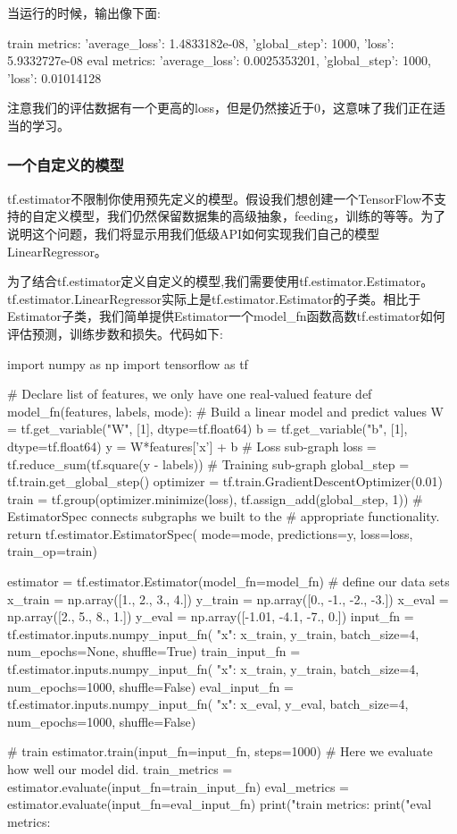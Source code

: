 当运行的时候，输出像下面:
\begin{pythoncode}
train metrics: {'average_loss': 1.4833182e-08, 'global_step': 1000, 'loss': 5.9332727e-08}
eval metrics: {'average_loss': 0.0025353201, 'global_step': 1000, 'loss': 0.01014128}
\end{pythoncode}
注意我们的评估数据有一个更高的loss，但是仍然接近于0，这意味了我们正在适当的学习。
\subsubsection{一个自定义的模型}
tf.estimator不限制你使用预先定义的模型。假设我们想创建一个TensorFlow不支持的自定义模型，我们仍然保留数据集的高级抽象，feeding，训练的等等。为了说明这个问题，我们将显示用我们低级API如何实现我们自己的模型LinearRegressor。

为了结合tf.estimator定义自定义的模型,我们需要使用tf.estimator.Estimator。tf.estimator.LinearRegressor实际上是tf.estimator.Estimator的子类。相比于Estimator子类，我们简单提供Estimator一个model\_fn函数高数tf.estimator如何评估预测，训练步数和损失。代码如下:
\begin{pythoncode}
import numpy as np
import tensorflow as tf

# Declare list of features, we only have one real-valued feature
def model_fn(features, labels, mode):
  # Build a linear model and predict values
  W = tf.get_variable("W", [1], dtype=tf.float64)
  b = tf.get_variable("b", [1], dtype=tf.float64)
  y = W*features['x'] + b
  # Loss sub-graph
  loss = tf.reduce_sum(tf.square(y - labels))
  # Training sub-graph
  global_step = tf.train.get_global_step()
  optimizer = tf.train.GradientDescentOptimizer(0.01)
  train = tf.group(optimizer.minimize(loss),
                   tf.assign_add(global_step, 1))
  # EstimatorSpec connects subgraphs we built to the
  # appropriate functionality.
  return tf.estimator.EstimatorSpec(
      mode=mode,
      predictions=y,
      loss=loss,
      train_op=train)

estimator = tf.estimator.Estimator(model_fn=model_fn)
# define our data sets
x_train = np.array([1., 2., 3., 4.])
y_train = np.array([0., -1., -2., -3.])
x_eval = np.array([2., 5., 8., 1.])
y_eval = np.array([-1.01, -4.1, -7., 0.])
input_fn = tf.estimator.inputs.numpy_input_fn(
    {"x": x_train}, y_train, batch_size=4, num_epochs=None, shuffle=True)
train_input_fn = tf.estimator.inputs.numpy_input_fn(
    {"x": x_train}, y_train, batch_size=4, num_epochs=1000, shuffle=False)
eval_input_fn = tf.estimator.inputs.numpy_input_fn(
    {"x": x_eval}, y_eval, batch_size=4, num_epochs=1000, shuffle=False)

# train
estimator.train(input_fn=input_fn, steps=1000)
# Here we evaluate how well our model did.
train_metrics = estimator.evaluate(input_fn=train_input_fn)
eval_metrics = estimator.evaluate(input_fn=eval_input_fn)
print("train metrics: %
print("eval metrics: %
\end{pythoncode}
